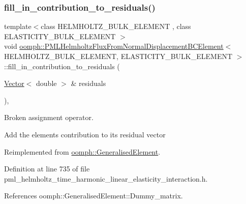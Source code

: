 \subsubsection{\texorpdfstring{fill\+\_\+in\+\_\+contribution\+\_\+to\+\_\+residuals()}{fill\_in\_contribution\_to\_residuals()}}
{\footnotesize\ttfamily template$<$class H\+E\+L\+M\+H\+O\+L\+T\+Z\+\_\+\+B\+U\+L\+K\+\_\+\+E\+L\+E\+M\+E\+NT , class E\+L\+A\+S\+T\+I\+C\+I\+T\+Y\+\_\+\+B\+U\+L\+K\+\_\+\+E\+L\+E\+M\+E\+NT $>$ \\
void \hyperlink{classoomph_1_1PMLHelmholtzFluxFromNormalDisplacementBCElement}{oomph\+::\+P\+M\+L\+Helmholtz\+Flux\+From\+Normal\+Displacement\+B\+C\+Element}$<$ H\+E\+L\+M\+H\+O\+L\+T\+Z\+\_\+\+B\+U\+L\+K\+\_\+\+E\+L\+E\+M\+E\+NT, E\+L\+A\+S\+T\+I\+C\+I\+T\+Y\+\_\+\+B\+U\+L\+K\+\_\+\+E\+L\+E\+M\+E\+NT $>$\+::fill\+\_\+in\+\_\+contribution\+\_\+to\+\_\+residuals (\begin{DoxyParamCaption}\item[{\hyperlink{classoomph_1_1Vector}{Vector}$<$ double $>$ \&}]{residuals }\end{DoxyParamCaption})\hspace{0.3cm}{\ttfamily [inline]}, {\ttfamily [virtual]}}



Broken assignment operator. 

Add the element\textquotesingle{}s contribution to its residual vector 

Reimplemented from \hyperlink{classoomph_1_1GeneralisedElement_a310c97f515e8504a48179c0e72c550d7}{oomph\+::\+Generalised\+Element}.



Definition at line 735 of file pml\+\_\+helmholtz\+\_\+time\+\_\+harmonic\+\_\+linear\+\_\+elasticity\+\_\+interaction.\+h.



References oomph\+::\+Generalised\+Element\+::\+Dummy\+\_\+matrix.

\mbox{\label{classoomph_1_1PMLHelmholtzFluxFromNormalDisplacementBCElement_a1efff41871abb12efe479ee7434b93b5}} 
